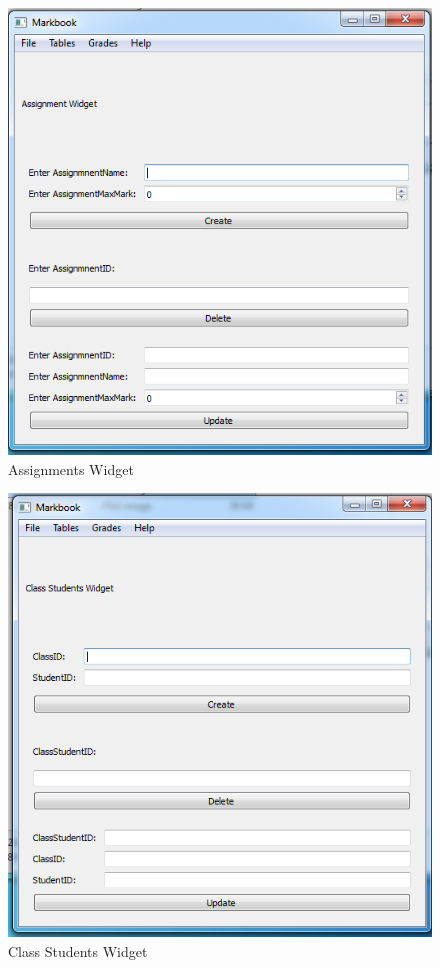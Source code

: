 \begin{figure}[H]
    \includegraphics[width=\textwidth]{./Images/assignments.png}
    \caption{Assignments Widget} \label{}
\end{figure}

\begin{figure}[H]
    \includegraphics[width=\textwidth]{./Images/class students.png}
    \caption{Class Students Widget} \label{}
\end{figure}

